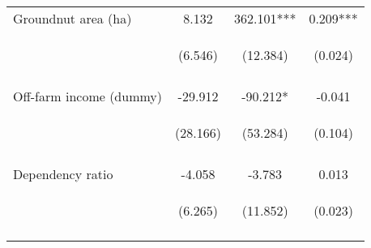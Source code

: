 \begin{center}
\begin{tabular}{lccc}
Groundnut area (ha) & 8.132 & 362.101*** & 0.209*** \\
 & \begin{footnotesize}(6.546)\end{footnotesize} & \begin{footnotesize}(12.384)\end{footnotesize} & \begin{footnotesize}(0.024)\end{footnotesize} \\
\vspace{4pt} & \begin{footnotesize}[0.214]\end{footnotesize} & \begin{footnotesize}[0.000]\end{footnotesize} & \begin{footnotesize}[0.000]\end{footnotesize} \\
Off-farm income (dummy) & -29.912 & -90.212* & -0.041 \\
 & \begin{footnotesize}(28.166)\end{footnotesize} & \begin{footnotesize}(53.284)\end{footnotesize} & \begin{footnotesize}(0.104)\end{footnotesize} \\
\vspace{4pt} & \begin{footnotesize}[0.288]\end{footnotesize} & \begin{footnotesize}[0.090]\end{footnotesize} & \begin{footnotesize}[0.697]\end{footnotesize} \\
Dependency ratio & -4.058 & -3.783 & 0.013 \\
 & \begin{footnotesize}(6.265)\end{footnotesize} & \begin{footnotesize}(11.852)\end{footnotesize} & \begin{footnotesize}(0.023)\end{footnotesize} \\
\vspace{4pt} & \begin{footnotesize}[0.517]\end{footnotesize} & \begin{footnotesize}[0.750]\end{footnotesize} & \begin{footnotesize}[0.566]\end{footnotesize} \\

\end{tabular}
\end{center}
